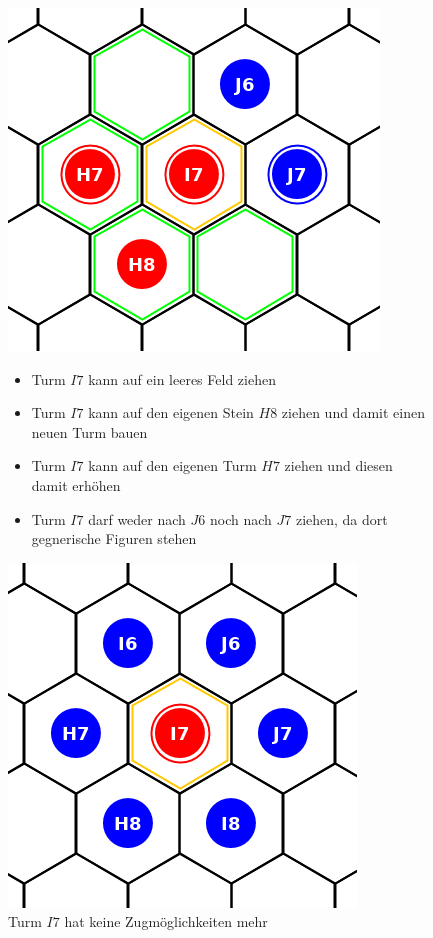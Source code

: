 \begin{figure}[ht]
\begin{center}
\includegraphics[scale=0.25]{graphic/tower-move.png}
\end{center}
\begin{itemize}
\item Turm $I7$ kann auf ein leeres Feld ziehen
\item Turm $I7$ kann auf den eigenen Stein $H8$ ziehen und damit einen neuen Turm bauen
\item Turm $I7$ kann auf den eigenen Turm $H7$ ziehen und diesen damit erhöhen
\item Turm $I7$ darf weder nach $J6$ noch nach $J7$ ziehen, da dort gegnerische Figuren stehen
\end{itemize}
\end{figure}

\begin{figure}[ht]
\begin{center}
\includegraphics[scale=0.25]{graphic/neighbor-blocked-tower.png}
\end{center}
\caption*{Turm $I7$ hat keine Zugmöglichkeiten mehr}
\end{figure}

